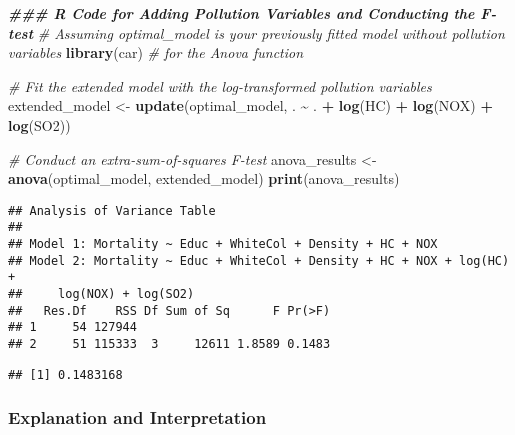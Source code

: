\documentclass[
]{article}
\newenvironment{Shaded}{\begin{snugshade}}{\end{snugshade}}
\newcommand{\CommentTok}[1]{\textcolor[rgb]{0.56,0.35,0.01}{\textit{#1}}}
\newcommand{\DecValTok}[1]{\textcolor[rgb]{0.00,0.00,0.81}{#1}}
\newcommand{\DocumentationTok}[1]{\textcolor[rgb]{0.56,0.35,0.01}{\textbf{\textit{#1}}}}
\newcommand{\FunctionTok}[1]{\textcolor[rgb]{0.13,0.29,0.53}{\textbf{#1}}}
\newcommand{\NormalTok}[1]{#1}
\newcommand{\OtherTok}[1]{\textcolor[rgb]{0.56,0.35,0.01}{#1}}
\newcommand{\SpecialCharTok}[1]{\textcolor[rgb]{0.81,0.36,0.00}{\textbf{#1}}}
\newcommand{\StringTok}[1]{\textcolor[rgb]{0.31,0.60,0.02}{#1}}
\begin{document}
\begin{Shaded}
\begin{Highlighting}[]
\DocumentationTok{\#\#\# R Code for Adding Pollution Variables and Conducting the F{-}test}
\CommentTok{\# Assuming \textquotesingle{}optimal\_model\textquotesingle{} is your previously fitted model without pollution variables}
\FunctionTok{library}\NormalTok{(car)  }\CommentTok{\# for the \textquotesingle{}Anova\textquotesingle{} function}

\CommentTok{\# Fit the extended model with the log{-}transformed pollution variables}
\NormalTok{extended\_model }\OtherTok{\textless{}{-}} \FunctionTok{update}\NormalTok{(optimal\_model, . }\SpecialCharTok{\textasciitilde{}}\NormalTok{ . }\SpecialCharTok{+} \FunctionTok{log}\NormalTok{(HC) }\SpecialCharTok{+} \FunctionTok{log}\NormalTok{(NOX) }\SpecialCharTok{+} \FunctionTok{log}\NormalTok{(SO2))}

\CommentTok{\# Conduct an extra{-}sum{-}of{-}squares F{-}test}
\NormalTok{anova\_results }\OtherTok{\textless{}{-}} \FunctionTok{anova}\NormalTok{(optimal\_model, extended\_model)}
\FunctionTok{print}\NormalTok{(anova\_results)}
\end{Highlighting}
\end{Shaded}

\begin{verbatim}
## Analysis of Variance Table
## 
## Model 1: Mortality ~ Educ + WhiteCol + Density + HC + NOX
## Model 2: Mortality ~ Educ + WhiteCol + Density + HC + NOX + log(HC) + 
##     log(NOX) + log(SO2)
##   Res.Df    RSS Df Sum of Sq      F Pr(>F)
## 1     54 127944                           
## 2     51 115333  3     12611 1.8589 0.1483
\end{verbatim}

\begin{Shaded}
\end{Shaded}

\begin{verbatim}
## [1] 0.1483168
\end{verbatim}

\hypertarget{explanation-and-interpretation-1}{%
\subsubsection{Explanation and
Interpretation}\label{explanation-and-interpretation-1}}
\end{document}
